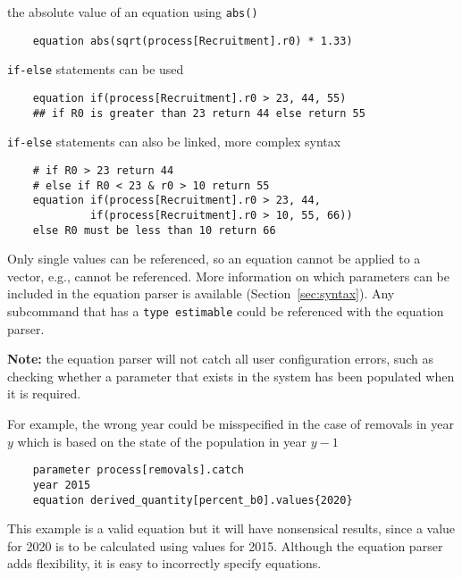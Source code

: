 the absolute value of an equation using \texttt{abs()}

{\small{\begin{verbatim}
	equation abs(sqrt(process[Recruitment].r0) * 1.33)
\end{verbatim}}}

\texttt{if-else} statements can be used

{\small{\begin{verbatim}
	equation if(process[Recruitment].r0 > 23, 44, 55)
	## if R0 is greater than 23 return 44 else return 55
\end{verbatim}}}

\texttt{if-else} statements can also be linked, more complex syntax

{\small{\begin{verbatim}
	# if R0 > 23 return 44
	# else if R0 < 23 & r0 > 10 return 55
	equation if(process[Recruitment].r0 > 23, 44,
	         if(process[Recruitment].r0 > 10, 55, 66))
	else R0 must be less than 10 return 66
\end{verbatim}}}

Only single values can be referenced, so an equation cannot be applied to a vector, e.g.,  cannot be referenced. More information on which parameters can be included in the equation parser is available (Section~\ref{sec:syntax}). Any subcommand that has a \texttt{type estimable} could be referenced with the equation parser.

\textbf{Note:} the equation parser will not catch all user configuration errors, such as checking whether a parameter that exists in the system has been populated when it is required.

For example, the wrong year could be misspecified in the case of removals in year $y$ which is based on the state of the population in year $y-1$

{\small{\begin{verbatim}
	parameter process[removals].catch
	year 2015
	equation derived_quantity[percent_b0].values{2020}
\end{verbatim}}}

This example is a valid equation but it will have nonsensical results, since a value for 2020 is to be calculated using values for 2015. Although the equation parser adds flexibility, it is easy to incorrectly specify equations.

\subsection{}\label{sec:Project}

